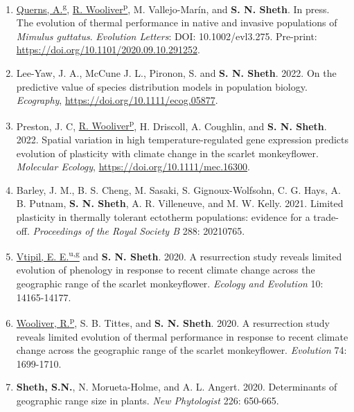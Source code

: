 \documentclass[11pt,english]{article}\usepackage[]{graphicx}\usepackage[]{color}
\newcommand\reverselabel[1]{%
  \def\theenumi{}%
  \renewcommand\makelabel{\makebox[\dimexpr\labelwidth-3pt\relax][r]{%
    \the\numexpr#1-\value{enumi}+1\relax}}}%
\begin{document}
\begin{hangparas}{.5in}{1}
\begin{enumerate}
\reverselabel{26} %

\item \underline{Querns, A.\textsuperscript{g}}, \underline{R. Wooliver\textsuperscript{p}}, M. Vallejo-Mar\'in, and \textbf{S. N. Sheth}. In press. The evolution of thermal performance in native and invasive populations of \emph{Mimulus guttatus}. \emph{Evolution Letters}: DOI: 10.1002/evl3.275.
Pre-print: \url{https://doi.org/10.1101/2020.09.10.291252}.

\item Lee-Yaw, J. A., McCune J. L., Pironon, S. and \textbf{S. N. Sheth}. 2022. On the predictive value of species distribution models in population biology. \emph{Ecography}, \url{https://doi.org/10.1111/ecog.05877}.

\item Preston, J. C, \underline{R. Wooliver\textsuperscript{p}}, H. Driscoll, A. Coughlin, and \textbf{S. N. Sheth}. 2022. Spatial variation in high temperature-regulated gene expression predicts evolution of plasticity with climate change in the scarlet monkeyflower. \emph{Molecular Ecology}, \url{https://doi.org/10.1111/mec.16300}. 

\item Barley, J. M., B. S. Cheng, M. Sasaki, S. Gignoux-Wolfsohn, C. G. Hays, A. B. Putnam, \textbf{S. N. Sheth}, A. R. Villeneuve, and M. W. Kelly. 2021. Limited plasticity in thermally tolerant ectotherm populations: evidence for a trade-off. \emph{Proceedings of the Royal Society B} 288: 20210765.

\item \underline{Vtipil, E. E.\textsuperscript{u,g}} and \textbf{S. N. Sheth}. 2020. A resurrection study reveals limited evolution of phenology in response to recent climate change across the geographic range of the scarlet monkeyflower. \emph{Ecology and Evolution} 10: 14165-14177.

\item \underline{Wooliver, R.\textsuperscript{p}}, S. B. Tittes, and \textbf{S. N. Sheth}. 2020. A resurrection study reveals limited evolution of thermal performance in response to recent climate change across the geographic range of the scarlet monkeyflower. \emph{Evolution} 74: 1699-1710.

\item \textbf{Sheth, S.N.}, N. Morueta-Holme, and A. L. Angert. 2020. Determinants of geographic range size in plants. \emph{New Phytologist} 226: 650-665.


\end{enumerate}
\end{hangparas}
\end{document}
